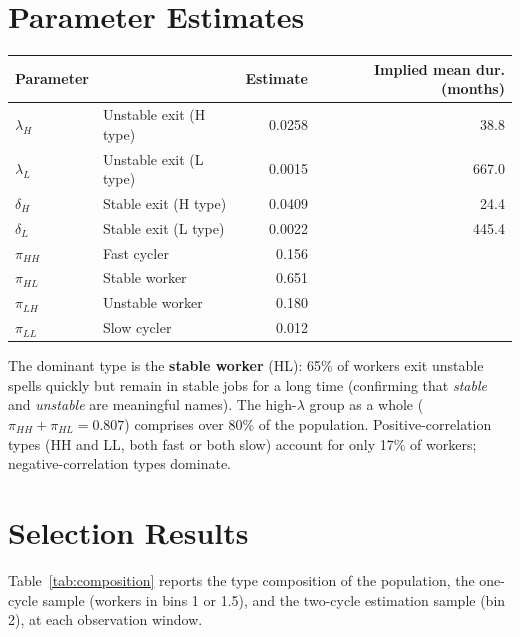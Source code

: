 \documentclass[12pt,a4paper]{article}
\begin{document}
\section{Parameter Estimates}

\begin{center}
\begin{tabular}{llrr}
\toprule
Parameter & & Estimate & Implied mean dur. (months)\\
\midrule
$\lambda_H$ & Unstable exit (H type) & 0.0258 & 38.8\\
$\lambda_L$ & Unstable exit (L type) & 0.0015 & 667.0\\
$\delta_H$  & Stable exit (H type)   & 0.0409 & 24.4\\
$\delta_L$  & Stable exit (L type)   & 0.0022 & 445.4\\
\midrule
$\pi_{HH}$ & Fast cycler      & 0.156 &\\
$\pi_{HL}$ & Stable worker    & 0.651 &\\
$\pi_{LH}$ & Unstable worker  & 0.180 &\\
$\pi_{LL}$ & Slow cycler      & 0.012 &\\
\bottomrule
\end{tabular}
\end{center}

\noindent
The dominant type is the \textbf{stable worker} (HL): 65\% of workers exit unstable spells quickly but remain in stable jobs for a long time (confirming that \textit{stable} and \textit{unstable} are meaningful names). The high-$\lambda$
group as a whole ($\pi_{HH} + \pi_{HL} = 0.807$) comprises over 80\% of the
population. Positive-correlation types (HH and LL, both fast or both slow) account for
only 17\% of workers; negative-correlation types dominate.

\section{Selection Results}
\label{sec:results}

Table~\ref{tab:composition} reports the type composition of the population, the
one-cycle sample (workers in bins 1 or 1.5), and the two-cycle estimation sample
(bin 2), at each observation window.
\end{document}

